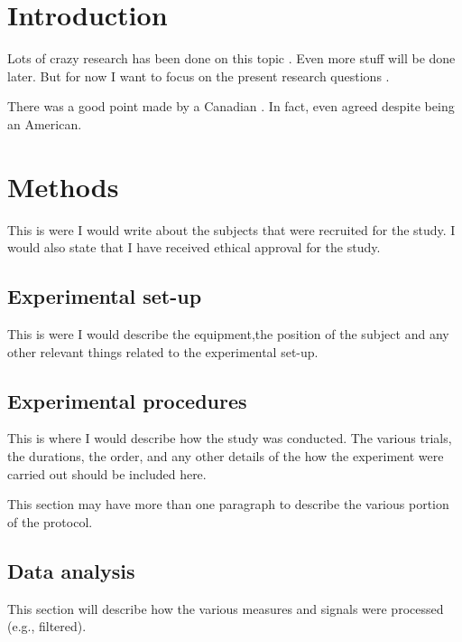 \documentclass[letterpaper,12pt]{article}
\begin{document}
\newpage
\section*{Introduction}

Lots of crazy research has been done on this topic \citep{Heroux:2015}. 
Even more stuff will be done later. 
But for now I want to focus on the present research questions \citep{Butler2003}.

There was a good point made by a Canadian \citep{Brownstone2006}. 
In fact, \cite{Sawczuk1995} even agreed despite being an American.

\lipsum[1]


\section*{Methods}

This is were I would write about the subjects that were recruited for the study. 
I would also state that I have received ethical approval for the study.

\subsection*{Experimental set-up}

This is were I would describe the equipment,the position of the subject and any other relevant things related to the experimental set-up.

\subsection*{Experimental procedures}

This is where I would describe how the study was conducted. 
The various trials, the durations, the order, and any other details of the how the experiment were carried out should be included here.

This section may have more than one paragraph to describe the various portion of the protocol.

\subsection*{Data analysis}

This section will describe how the various measures and signals were processed (e.g., filtered). 
\end{document}
